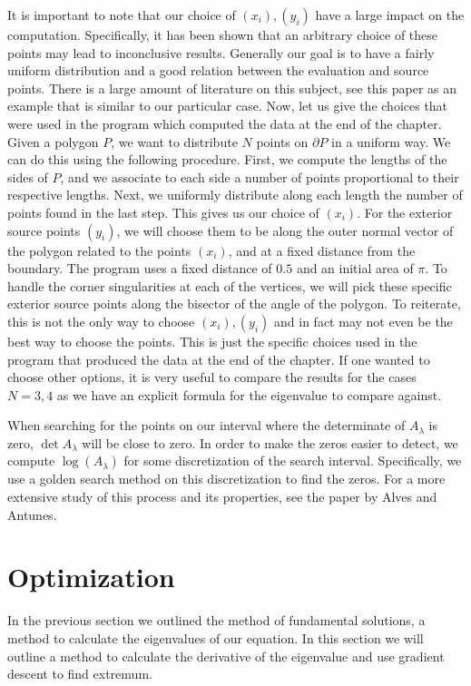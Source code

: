 \documentclass[12pt]{report}
\numberwithin{definition}{section}
\begin{document}
It is important to note that our choice of $(x_{i}),(y_{i})$ have a large impact on the computation.
Specifically, it has been shown that an arbitrary choice of these points may lead to inconclusive results\cite{fund2}.
Generally our goal is to have a fairly uniform distribution and a good relation between the evaluation and source points.
There is a large amount of literature on this subject, see this paper as an example that is similar to our particular case\cite{fund}.
Now, let us give the choices that were used in the program which computed the data at the end of the chapter.
Given a polygon $P$, we want to distribute $N$ points on $\partial P$ in a uniform way.
We can do this using the following procedure.
First, we compute the lengths of the sides of $P$, and we associate to each side a number of points proportional to their respective lengths.
Next, we uniformly distribute along each length the number of points found in the last step.
This gives us our choice of $(x_{i})$.
For the exterior source points $(y_{i})$, we will choose them to be along the outer normal vector of the polygon related to the points $(x_{i})$, and at a fixed distance from the boundary.
The program uses a fixed distance of $0.5$ and an initial area of $\pi$.
To handle the corner singularities at each of the vertices, we will pick these specific exterior source points along the bisector of the angle of the polygon.
To reiterate, this is not the only way to choose $(x_{i}),(y_{i})$ and in fact may not even be the best way to choose the points.
This is just the specific choices used in the program that produced the data at the end of the chapter.
If one wanted to choose other options, it is very useful to compare the results for the cases $N=3,4$ as we have an explicit formula for the eigenvalue to compare against.



When searching for the points on our interval where the determinate of $A_{\lambda}$ is zero, $\det A_{\lambda}$ will be close to zero.
In order to make the zeros easier to detect, we compute $\log (A_{\lambda})$ for some discretization of the search interval.
Specifically, we use a golden search method on this discretization to find the zeros.
For a more extensive study of this process and its properties, see the paper by Alves and Antunes\cite{fund}.





\break

\section{Optimization}
In the previous section we outlined the method of fundamental solutions, a method to calculate the eigenvalues of our equation.
In this section we will outline a method to calculate the derivative of the eigenvalue and use gradient descent to find extremum.
\end{document}
